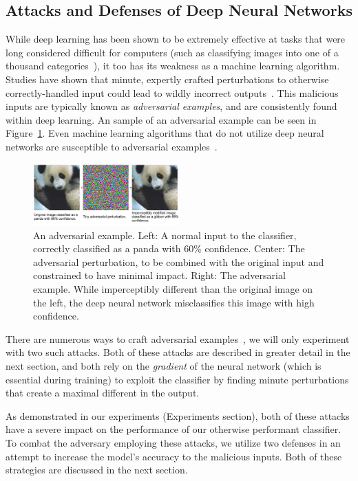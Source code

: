 \documentclass{article}
\begin{document}
\subsection{Attacks and Defenses of Deep Neural Networks}

While deep learning has been shown to be extremely effective at tasks that were
long considered difficult for computers (such as classifying images into one of
a thousand categories~\cite{krizhevsky2012imagenet}), it too has its weakness as
a machine learning algorithm. Studies have shown that minute, expertly crafted
perturbations to otherwise correctly-handled input could lead to wildly
incorrect outputs~\cite{szegedy2013intriguing}. This malicious inputs are
typically known as \textit{adversarial examples}, and are consistently found
within deep learning. An sample of an adversarial example can be seen in
Figure~\ref{fig:ax-example}. Even machine learning algorithms that do not utilize deep
neural networks are susceptible to adversarial
examples~\cite{papernot2016transferability}.

\begin{figure}
  \includegraphics[width=0.5\textwidth]{ax-example}
  \caption{An adversarial example. Left: A normal input to the classifier,
  correctly classified as a panda with 60\% confidence. Center: The adversarial
perturbation, to be combined with the original input and constrained to have
minimal impact. Right: The adversarial example. While imperceptibly different
than the original image on the left, the deep neural network misclassifies this
image with high confidence.}
\label{fig:ax-example}
\end{figure}

There are numerous ways to craft adversarial
examples~\cite{szegedy2013intriguing,goodfellow2014explaining,nguyen2015deep,papernot2016limitations,carlini2017towards},
we will only experiment with two such attacks. Both of these attacks are
described in greater detail in the next section, and both rely on the
\textit{gradient} of the neural network (which is essential during training) to
exploit the classifier by finding minute perturbations that create a maximal
different in the output.

As demonstrated in our experiments (Experiments section), both of these
attacks have a severe impact on the performance of our otherwise performant
classifier. To combat the adversary employing these attacks, we utilize two
defenses in an attempt to increase the model's accuracy to the malicious inputs.
Both of these strategies are discussed in the next section.
\end{document}

